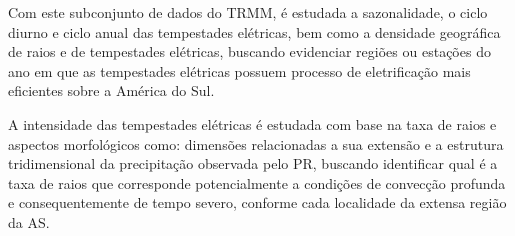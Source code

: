 Com este subconjunto de dados do TRMM, é estudada a sazonalidade, o ciclo diurno e ciclo anual das tempestades elétricas, bem como a densidade geográfica de raios e de tempestades elétricas, buscando evidenciar regiões ou estações do ano em que as tempestades elétricas possuem processo de eletrificação mais eficientes sobre a América do Sul.

A intensidade das tempestades elétricas é estudada com base na taxa de raios e aspectos morfológicos como: dimensões relacionadas a sua extensão e a estrutura tridimensional da precipitação observada pelo PR, buscando identificar qual é a taxa de raios que corresponde potencialmente a condições de convecção profunda e consequentemente de tempo severo, conforme cada localidade da extensa região da AS.

 





